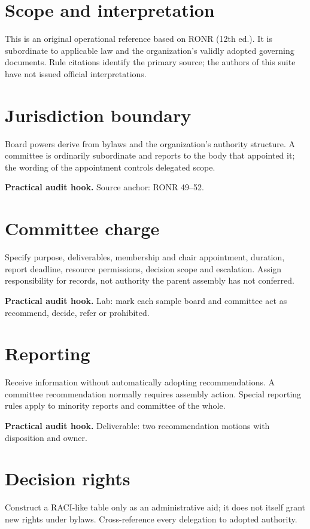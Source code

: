\documentclass[11pt]{article}
\begin{document}
\SuiteOpen
\section{Scope and interpretation}
This is an original operational reference based on RONR (12th ed.). It is subordinate to applicable law and the organization’s validly adopted governing documents. Rule citations identify the primary source; the authors of this suite have not issued official interpretations.

\section{Jurisdiction boundary}
Board powers derive from bylaws and the organization’s authority structure. A committee is ordinarily subordinate and reports to the body that appointed it; the wording of the appointment controls delegated scope.

\textbf{Practical audit hook.} Source anchor: RONR 49--52.

\section{Committee charge}
Specify purpose, deliverables, membership and chair appointment, duration, report deadline, resource permissions, decision scope and escalation. Assign responsibility for records, not authority the parent assembly has not conferred.

\textbf{Practical audit hook.} Lab: mark each sample board and committee act as recommend, decide, refer or prohibited.

\section{Reporting}
Receive information without automatically adopting recommendations. A committee recommendation normally requires assembly action. Special reporting rules apply to minority reports and committee of the whole.

\textbf{Practical audit hook.} Deliverable: two recommendation motions with disposition and owner.

\section{Decision rights}
Construct a RACI-like table only as an administrative aid; it does not itself grant new rights under bylaws. Cross-reference every delegation to adopted authority.
\end{document}
